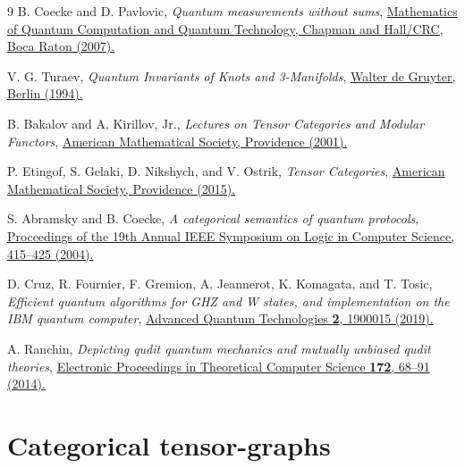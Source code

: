 \documentclass[a4paper,twocolumn,11pt,unpublished]{quantumarticle}
\numberwithin{equation}{section}
\begin{document}
\begin{thebibliography}{9}
B. Coecke and D. Pavlovic, \textit{Quantum measurements without sums}, \href{https://doi.org/10.1201/9781584889007-24}{Mathematics of Quantum Computation and Quantum Technology, Chapman and Hall/CRC, Boca Raton (2007).}

V. G. Turaev, \textit{Quantum Invariants of Knots and 3-Manifolds}, \href{https://doi.org/10.1515/9783110881615}{Walter de Gruyter, Berlin (1994).}

B. Bakalov and A. Kirillov, Jr., \textit{Lectures on Tensor Categories and Modular Functors}, \href{https://doi.org/10.1090/ulect/021}{American Mathematical Society, Providence (2001).}

P. Etingof, S. Gelaki, D. Nikshych, and V. Ostrik, \textit{Tensor Categories}, \href{https://doi.org/10.1090/surv/205}{American Mathematical Society, Providence (2015).}

S. Abramsky and B. Coecke, \textit{A categorical semantics of quantum protocols}, \href{https://doi.org/10.1109/LICS.2004.1319636}{Proceedings of the 19th Annual IEEE Symposium on Logic in Computer Science, 415--425 (2004).}

D. Cruz, R. Fournier, F. Gremion, A. Jeannerot, K. Komagata, and T. Tosic, \textit{Efficient quantum algorithms for GHZ and W states, and implementation on the IBM quantum computer}, \href{https://doi.org/10.1002/qute.201900015}{Advanced Quantum Technologies \textbf{2}, 1900015 (2019).}

A. Ranchin, \textit{Depicting qudit quantum mechanics and mutually unbiased qudit theories}, \href{https://doi.org/10.4204/EPTCS.172.6}{Electronic Proceedings in Theoretical Computer Science \textbf{172}, 68--91 (2014).}
 
\end{thebibliography}



\onecolumn\newpage
\appendix
\section{Categorical tensor-graphs}
\end{document}
